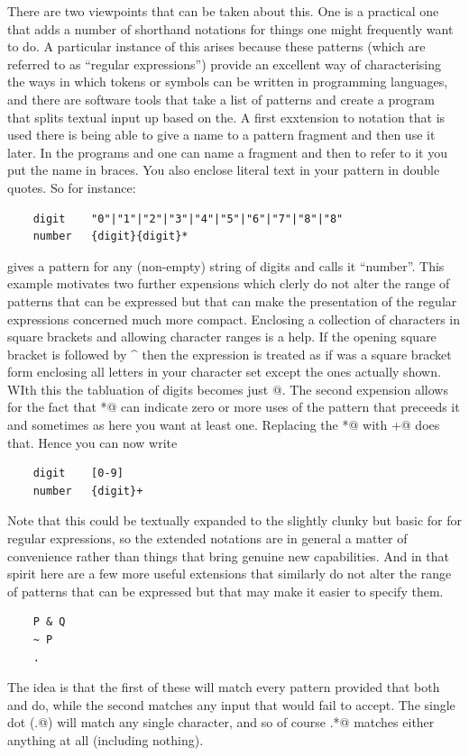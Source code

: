 There are two viewpoints that can be taken about this. One is a practical
one that adds a number of shorthand notations for things one might
frequently want to do. A particular instance of this arises because these
patterns (which are referred to as ``regular expressions'') provide
an excellent way of characterising the ways in which tokens or symbols can
be written in programming languages, and there are software tools that take
a list of patterns and create a program that splits textual input up based
on the. A first exxtension to notation that is used there is being able
to give a name to a pattern fragment and then use it later. In the programs
\verb@lex@ and \verb@flex@ one can name a fragment and then to refer to
it you put the name in braces. You also enclose literal text in your pattern
in double quotes. So for instance:
\begin{verbatim}
    digit    "0"|"1"|"2"|"3"|"4"|"5"|"6"|"7"|"8"|"8"
    number   {digit}{digit}*
\end{verbatim}
gives a pattern for any (non-empty) string of digits and calls it ``number''.
This example motivates two further expensions which clerly do not alter
the range of patterns that can be expressed but that can make the
presentation of the regular expressions concerned much more compact.
Enclosing a collection of characters in square brackets and allowing
character ranges is a help. If the opening square bracket is followed by
\^{} then the expression is treated as if was a square bracket form
enclosing all letters in your character set except the ones actually shown.
WIth this the tabluation of digits becomes just \verb@[0-9]@. The second
expension allows for the fact that \verb@*@ can indicate zero or more
uses of the pattern that preceeds it and sometimes as here you want at least
one. Replacing the \verb@*@ with \verb@+@ does that. Hence you can now write
\begin{verbatim}
    digit    [0-9]
    number   {digit}+
\end{verbatim}
Note that this could be textually expanded to the slightly clunky but
basic for for regular expressions, so the extended notations are in general
a matter of convenience rather than things that bring genuine new
capabilities. And in that spirit here are a few more useful extensions that
similarly do not alter the range of patterns that can be expressed but that
may make it easier to specify them.
\begin{verbatim}
    P & Q
    ~ P
    .
\end{verbatim}
The idea is that the first of these will match every pattern provided that
both \verb@P@ and \verb@Q@ do, while the second matches any input that
\verb@P@ would fail to accept. The single dot (\verb@.@) will match any
single character, and so of course \verb@.*@ matches either anything
at all (including nothing).

